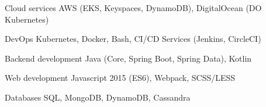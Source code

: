 

\begin{cvskills}

  \cvskill
    {Cloud services} %
    {AWS (EKS, Keyspaces, DynamoDB), DigitalOcean (DO Kubernetes)} %

  \cvskill
    {DevOps} %
    {Kubernetes, Docker, Bash, CI/CD Services (Jenkins, CircleCI)} %

  \cvskill
    {Backend development} %
    {Java (Core, Spring Boot, Spring Data), Kotlin} %

  \cvskill
    {Web development} %
    {Javascript 2015 (ES6), Webpack, SCSS/LESS} %

  \cvskill
  {Databases} %
  {SQL, MongoDB, DynamoDB, Cassandra} %

\end{cvskills}

